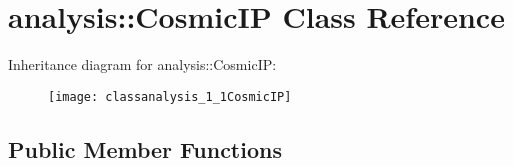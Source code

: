 \hypertarget{classanalysis_1_1CosmicIP}{}\section{analysis\+:\+:Cosmic\+IP Class Reference}
\label{classanalysis_1_1CosmicIP}
Inheritance diagram for analysis\+:\+:Cosmic\+IP\+:\begin{figure}[H]
\begin{center}
\leavevmode
\texttt{[image: classanalysis\_1\_1CosmicIP]}
\end{center}
\end{figure}
\subsection*{Public Member Functions}
